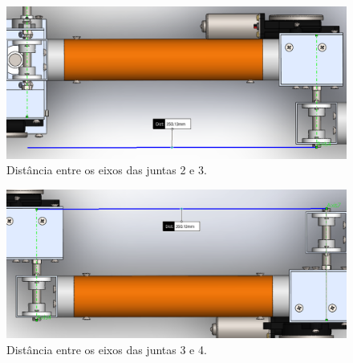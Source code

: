 \begin{figure}[ht]
    \caption{Distância entre os eixos das juntas 2 e 3.}    
    \begin{centering}

        \includegraphics[width=0.9\columnwidth]{adendo/images/a2.png}
    
    \par\end{centering}

    \label{fig:a2}
\end{figure}

\begin{figure}[ht]
    \caption{Distância entre os eixos das juntas 3 e 4.}    
    \begin{centering}

        \includegraphics[width=0.9\columnwidth]{adendo/images/a3.png}
    
    \par\end{centering}

    \label{fig:a3}
\end{figure}

